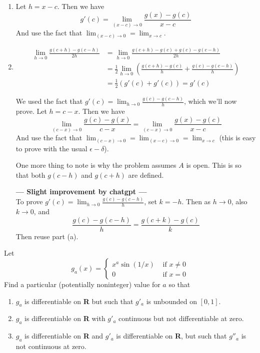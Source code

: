 \documentclass{oxmathproblems}
\begin{document}
\begin{questions}
\begin{solution}
  \begin{enumerate}[label=(\alph*)]
    \item Let $h = x-c$. Then we have
    \[g'(c) = \lim_{(x-c) \to 0} \frac{g(x)-g(c)}{x-c}\]
    And use the fact that $\lim_{(x-c) \to 0} = \lim_{x \to c}$.
    \item
    \begin{align*}
      \lim_{h \to 0}\frac{g(c+h)-g(c-h)}{2h} &= \lim_{h \to 0}\frac{g(c+h)-g(c)+g(c)-g(c-h)}{2h}\\
      &= \frac{1}{2}\lim_{h \to 0}\left( \frac{g(c+h)-g(c)}{h} + \frac{g(c)-g(c-h)}{h}\right)\\
      &= \frac{1}{2}(g'(c)+g'(c)) = g'(c)
    \end{align*}

    We used the fact that $g'(c) = \lim_{h \to 0}\frac{g(c)-g(c-h)}{h}$, which we'll now prove. Let $h=c-x$. Then we have
    \[\lim_{(c-x) \to 0}\frac{g(c)-g(x)}{c-x} = \lim_{(c-x) \to 0}\frac{g(x)-g(c)}{x-c}\]
    And use the fact that $\lim_{(c-x) \to 0} = \lim_{(x-c) \to 0} = \lim_{x \to c}$ (this is easy to prove with the usual $\epsilon-\delta$).

    One more thing to note is why the problem assumes $A$ is open. This is so that both $g(c-h)$ and $g(c+h)$ are defined.
    
    \textbf{--- Slight improvement by chatgpt ---}\\
    To prove $g'(c) = \lim_{h \to 0}\frac{g(c)-g(c-h)}{h}$, set $k=-h$. Then as $h \to 0$, also $k \to 0$, and
    \[\frac{g(c)-g(c-h)}{h}=\frac{g(c+k)-g(c)}{k}\]
    Then reuse part (a).
  \end{enumerate}
\end{solution}

\miquestion Let
\[
  g_{a}(x) = 
  \begin{cases}
    x^a \sin(1/x) & \text{ if } x \neq 0\\
    0 & \text{ if } x = 0
  \end{cases}
\]
Find a particular (potentially noninteger) value for $a$ so that
\begin{enumerate}[label=(\alph*)]
  \item $g_{a}$ is differentiable on \textbf{R} but such that $g'_{a}$ is unbounded on $[0, 1]$.
  \item  $g_{a}$ is differentiable on \textbf{R} with $g'_{a}$ continuous but not differentiable at zero.
  \item $g_{a}$ is differentiable on \textbf{R} and $g'_{a}$ is differentiable on \textbf{R}, but such that $g''_{a}$ is not continuous at zero.
\end{enumerate}


\end{questions}
\end{document}
